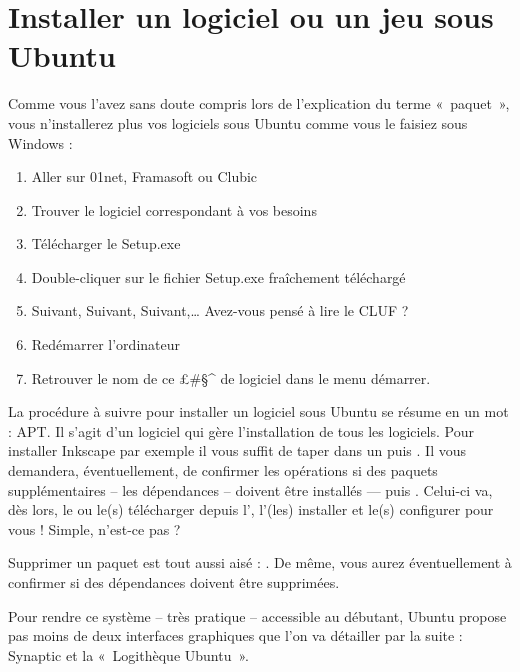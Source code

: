 \section{Installer un logiciel ou un jeu sous Ubuntu}
\label{RefInstallApp}
Comme vous l'avez sans doute compris lors de l'explication du terme «~paquet~», vous n'installerez plus vos logiciels sous Ubuntu comme vous le faisiez sous Windows :\par
\begin{enumerate}
\item Aller sur 01net, Framasoft ou Clubic
\item Trouver le logiciel correspondant à vos besoins
\item Télécharger le Setup.exe
\item Double-cliquer sur le fichier Setup.exe fraîchement téléchargé
\item Suivant, Suivant, Suivant,\ldots{} Avez-vous pensé à lire le CLUF ?
\item Redémarrer l'ordinateur
\item Retrouver le nom de ce £#§^\! de logiciel dans le menu démarrer.
\end{enumerate}
La procédure à suivre pour installer un logiciel sous Ubuntu se résume en un mot : APT. Il s'agit d'un logiciel qui gère l'installation de tous les logiciels. Pour installer Inkscape par exemple il vous suffit de taper  dans un  puis . Il vous demandera, éventuellement, de confirmer les opérations si des paquets supplémentaires -- les dépendances -- doivent être installés ---  puis . Celui-ci va, dès lors, le ou le(s) télécharger depuis l', l'(les) installer et le(s) configurer pour vous ! Simple, n'est-ce pas ?\par
Supprimer un paquet est tout aussi aisé : . De même, vous aurez éventuellement à confirmer si des dépendances doivent être supprimées.\par
Pour rendre ce système -- très pratique -- accessible au débutant, Ubuntu propose pas moins de deux interfaces graphiques que l'on va détailler par la suite : Synaptic et la «~Logithèque Ubuntu~».
